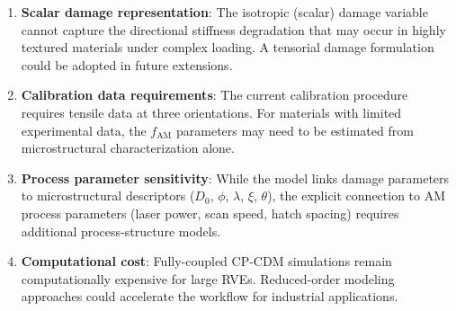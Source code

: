 \begin{enumerate}\def\labelenumi{(\arabic{enumi})}
    \item \textbf{Scalar damage representation}: The isotropic (scalar) damage variable cannot capture the directional stiffness degradation that may occur in highly textured materials under complex loading. A tensorial damage formulation \cite{chaboche1988continuum,murakami1988mechanical} could be adopted in future extensions.
    
    \item \textbf{Calibration data requirements}: The current calibration procedure requires tensile data at three orientations. For materials with limited experimental data, the $f_{\text{AM}}$ parameters may need to be estimated from microstructural characterization alone.
    
    \item \textbf{Process parameter sensitivity}: While the model links damage parameters to microstructural descriptors ($D_0$, $\phi$, $\lambda$, $\xi$, $\theta$), the explicit connection to AM process parameters (laser power, scan speed, hatch spacing) requires additional process-structure models.
    
    \item \textbf{Computational cost}: Fully-coupled CP-CDM simulations remain computationally expensive for large RVEs. Reduced-order modeling approaches \cite{zhang2021modeling} could accelerate the workflow for industrial applications.
    

\end{enumerate}
